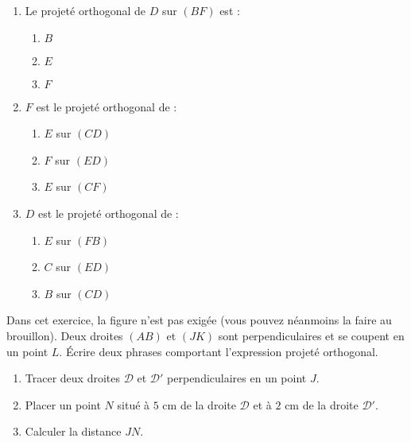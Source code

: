 \documentclass[a4paper,dvipsnames]{article}
\begin{document}
\begin{enumerate}
  \item Le projeté orthogonal de $D$ sur $(BF)$ est :
    \vspace{-2mm}
    \begin{multicols}{3}
      \begin{enumerate}
	\item $B$
	\item $E$
	\item $F$
      \end{enumerate}
    \end{multicols}
    \vspace{-2mm}
  \item $F$ est le projeté orthogonal de : 
    \vspace{-2mm}
    \begin{multicols}{3}
      \begin{enumerate}
	\item $E$ sur $(CD)$
	\item $F$ sur $(ED)$
	\item $E$ sur $(CF)$
      \end{enumerate}
    \end{multicols}
    \vspace{-2mm}
  \item $D$ est le projeté orthogonal de :
    \vspace{-2mm}
    \begin{multicols}{3}
      \begin{enumerate}
	\item $E$ sur $(FB)$
	\item $C$ sur $(ED)$
	\item $B$ sur $(CD)$
      \end{enumerate}
    \end{multicols}
\end{enumerate}

\bigskip

\exo[1 point] Dans cet exercice, la figure n'est pas exigée (vous pouvez néanmoins la faire au brouillon). Deux droites $(AB)$ et $(JK)$ sont perpendiculaires et se coupent en un point $L$. Écrire deux phrases comportant l'expression \og{}projeté orthogonal\fg{}.

\bigskip

\exo[2 points] \vspace{-2mm}
\begin{enumerate}
  \item Tracer deux droites $\mathcal{D}$ et $\mathcal{D}'$ perpendiculaires en un point $J$.
  \item Placer un point $N$ situé à $5$ cm de la droite $\mathcal{D}$ et à $2$ cm de la droite $\mathcal{D}'$.
  \item Calculer la distance $JN$.
\end{enumerate}
\end{document}
